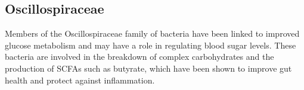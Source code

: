 \documentclass[
]{article}
\begin{document}
\subsection{Oscillospiraceae}

\begin{small}
Members of the Oscillospiraceae family of bacteria have been linked to improved 
glucose metabolism and may have a role in regulating blood sugar levels. These 
bacteria are involved in the breakdown of complex carbohydrates and the 
production of SCFAs such as butyrate, which have been shown to improve gut 
health and protect against inflammation.
\end{small}
\end{document}
